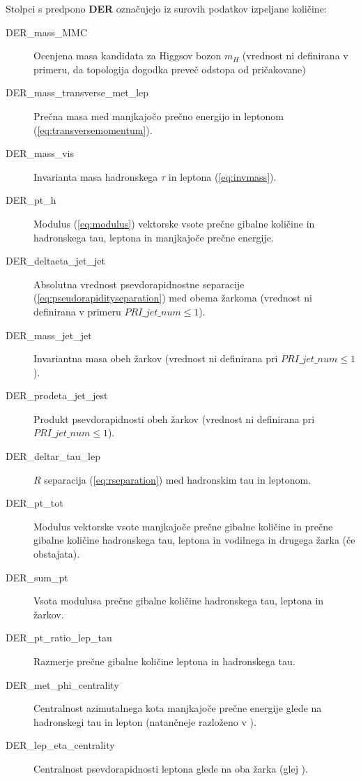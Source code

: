 \documentclass[11pt,a4paper,openany]{book}
\begin{document}
Stolpci s predpono \textbf{DER} označujejo iz surovih podatkov izpeljane količine:
\begin{changemargin}{0.5cm}{0.0cm} 
\begin{description}
	\item[DER\_mass\_MMC] Ocenjena masa kandidata za Higgsov bozon $m_H$ (vrednost ni definirana v primeru, da topologija dogodka preveč odstopa od pričakovane)
	\item[DER\_mass\_transverse\_met\_lep] Prečna masa med manjkajočo prečno energijo in leptonom (\ref{eq:transversemomentum}).
	\item[DER\_mass\_vis] Invarianta masa hadronskega $\tau$ in leptona (\ref{eq:invmass}).
	\item[DER\_pt\_h] Modulus (\ref{eq:modulus}) vektorske vsote prečne gibalne količine in hadronskega tau, leptona in manjkajoče prečne energije.
	\item[DER\_deltaeta\_jet\_jet] Absolutna vrednost psevdorapidnostne separacije (\ref{eq:pseudorapidityseparation}) med obema žarkoma (vrednost ni definirana v primeru $PRI\_jet\_num \le 1$).
	\item[DER\_mass\_jet\_jet] Invariantna masa obeh žarkov (vrednost ni definirana pri $PRI\_jet\_num \le 1$).
	\item[DER\_prodeta\_jet\_jest] Produkt psevdorapidnosti obeh žarkov (vrednost ni definirana pri $PRI\_jet\_num \le 1$).
	\item[DER\_deltar\_tau\_lep] $R$ separacija (\ref{eq:rseparation}) med hadronskim tau in leptonom.
	\item[DER\_pt\_tot] Modulus vektorske vsote manjkajoče prečne gibalne količine in prečne gibalne količine hadronskega tau, leptona in vodilnega in drugega žarka (če obstajata).
	\item[DER\_sum\_pt] Vsota modulusa prečne gibalne količine hadronskega tau, leptona in žarkov.
	\item[DER\_pt\_ratio\_lep\_tau] Razmerje prečne gibalne količine leptona in hadronskega tau.
	\item[DER\_met\_phi\_centrality] Centralnost azimutalnega kota manjkajoče prečne energije glede na hadronskegi tau in lepton (natančneje razloženo v \cite{ChallengeDoc}).
	\item[DER\_lep\_eta\_centrality] Centralnost psevdorapidnosti leptona glede na oba žarka (glej \cite{ChallengeDoc}).
	
\end{description}
\end{changemargin}
\end{document}
